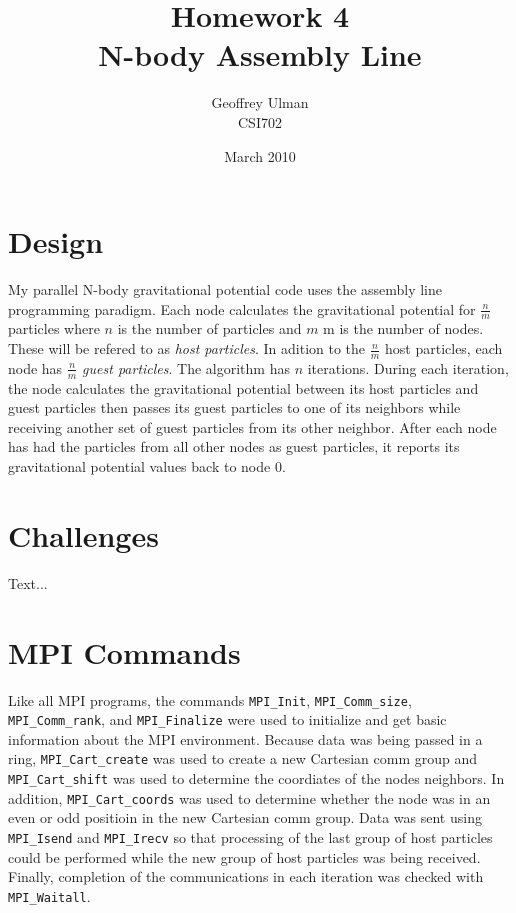 \documentclass{article}
\begin{document}
\title{Homework 4\\
       N-body Assembly Line}
\author{Geoffrey Ulman\\
        CSI702}
\date{March 2010}
\maketitle

\section{Design}
My parallel N-body gravitational potential code uses the assembly line programming paradigm. Each node calculates the gravitational potential for \( \frac{n}{m} \) particles where \( n \) is the number of particles and \( m \) m is the number of nodes. These will be refered to as \emph{host particles}. In adition to the \( \frac{n}{m} \) host particles, each node has \( \frac{n}{m} \) \emph{guest particles}. The algorithm has \( n \) iterations.
During each iteration, the node calculates the gravitational potential between its host particles and guest particles then passes its guest particles to one of its neighbors while receiving another set of guest particles from its other neighbor. After each node has had the particles from all other nodes as guest particles, it reports its gravitational potential values back to node 0.

\section{Challenges}
Text...

\section{MPI Commands}
Like all MPI programs, the commands \verb!MPI_Init!, \verb!MPI_Comm_size!, \verb!MPI_Comm_rank!, and \verb!MPI_Finalize! were used to initialize and get basic information about the MPI environment. Because data was being passed in a ring, \verb!MPI_Cart_create! was used to create a new Cartesian comm group and \verb!MPI_Cart_shift! was used to determine the coordiates of the nodes neighbors. In addition, \verb!MPI_Cart_coords! was used to determine whether the node was in an even or odd positioin in the new Cartesian comm group. Data was sent using \verb!MPI_Isend! and \verb!MPI_Irecv! so that processing of the last group of host particles could be performed while the new group of host particles was being received. Finally, completion of the communications in each iteration was checked with \verb!MPI_Waitall!.
\end{document}
